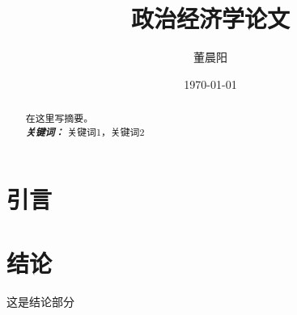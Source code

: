 \documentclass[a4paper,12pt]{ctexart}
\title{政治经济学论文}
\author{董晨阳}
\date{\today}
\providecommand{\keywords}[1]{\\\textbf{\textit{关键词：}} #1}
\begin{document}
\maketitle
\begin{abstract}
在这里写摘要。
\keywords{关键词1，关键词2}
\end{abstract}
\clearpage

\section{引言}

\section{结论}
这是结论部分\autocite{vaswani2017attention}
\printbibliography[heading=bibliography,title=参考文献]
\end{document}
